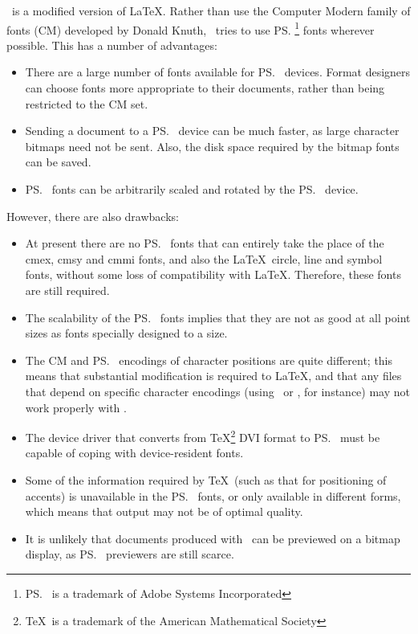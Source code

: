 \pslatex\ is a modified version of \LaTeX.  Rather than use the
Computer Modern family of fonts (CM) developed by Donald Knuth,
\pslatex\ tries to use \ps\footnote{\ps\ is a trademark of Adobe
Systems Incorporated} fonts wherever possible.  This has a number of
advantages:
\begin{itemize}
\item	There are a large number of fonts available for \ps\ devices.
	Format designers can choose fonts more appropriate to their
	documents, rather than being restricted to the CM set.
\item	Sending a document to a \ps\ device can be much faster, as
	large character bitmaps need not be sent.  Also, the disk
	space required by the bitmap fonts can be saved.
\item	\ps\ fonts can be arbitrarily scaled and rotated by the \ps\
	device. 
\end{itemize}
However, there are also drawbacks:
\begin{itemize}
\item	At present there are no \ps\ fonts that can entirely take the
	place of the {\sc cmex, cmsy} and {\sc cmmi} fonts, and also
	the \LaTeX\ circle, line and symbol fonts, without some loss
	of compatibility with \LaTeX.  Therefore, these fonts are
	still required.
\item	The scalability of the \ps\ fonts implies that they are not
	as good at all point sizes as fonts specially designed to a
	size. 
\item	The CM and \ps\ encodings of character positions are quite
	different; this means that substantial modification is
	required to \LaTeX, and that any files that depend on
	specific character encodings (using \cs\char\ or \cs\mathchar,
	for instance) may not work properly with \pslatex.
\item	The device driver that converts from \TeX\footnote{\TeX\ is a
	trademark of the American Mathematical Society} DVI format to
	\ps\ must be capable of coping with device-resident fonts.
\item	Some of the information required by \TeX\ (such as that for
	positioning of accents) is unavailable in the \ps\ fonts, or
	only available in different forms, which means that output may
	not be of optimal quality.
\item	It is unlikely that documents produced with \pslatex\ can be
	previewed on a bitmap display, as \ps\ previewers are still
	scarce. 
\end{itemize}

